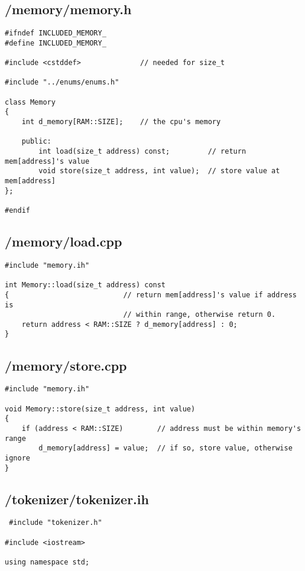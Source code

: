 \documentclass{article}
\begin{document}
\subsection*{/memory/memory.h}
\begin{verbatim}
#ifndef INCLUDED_MEMORY_
#define INCLUDED_MEMORY_

#include <cstddef>              // needed for size_t

#include "../enums/enums.h"

class Memory
{
    int d_memory[RAM::SIZE];    // the cpu's memory

    public:
        int load(size_t address) const;         // return mem[address]'s value
        void store(size_t address, int value);  // store value at mem[address]
};

#endif

\end{verbatim}
\subsection*{/memory/load.cpp}
\begin{verbatim}
#include "memory.ih"

int Memory::load(size_t address) const
{                           // return mem[address]'s value if address is
                            // within range, otherwise return 0.
    return address < RAM::SIZE ? d_memory[address] : 0;
}
\end{verbatim}
\subsection*{/memory/store.cpp}
\begin{verbatim}
#include "memory.ih"

void Memory::store(size_t address, int value)
{
    if (address < RAM::SIZE)        // address must be within memory's range
        d_memory[address] = value;  // if so, store value, otherwise ignore
}

\end{verbatim}

\subsection*{/tokenizer/tokenizer.ih}
\begin{verbatim}
 #include "tokenizer.h"

#include <iostream>

using namespace std;
\end{verbatim}
\end{document}
